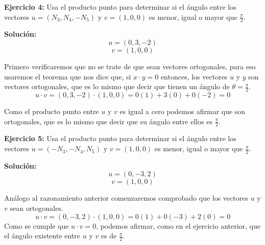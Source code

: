 \documentclass{article}
\begin{document}
\textbf{Ejercicio 4:} Usa el producto punto para determinar si el  ángulo entre los vectores $u = (N_3,N_4,-N_5)$ y $v = (1,0,0)$ es menor,
igual o mayor que $\frac{\pi}{2}$.
\vspace{10pt}


\textbf{Solución:}
$$u = (0, 3, -2)$$
$$v = (1, 0, 0 )$$


Primero verificaremos que no se trate de que sean vectores ortogonales, para eso usaremos el teorema que nos dice que, si $x \cdot y = 0$ entonces,
los vectores $u$ y $y$ son vectores ortogonales, que es lo mismo que decir que tienen un ángulo de $\theta =\frac{\pi}{2}$.
$$u \cdot v = (0, 3, -2) \cdot (1, 0, 0 ) = 0(1)+ 3(0) + 0(-2) = 0$$


Como el producto punto entre $u$ y $v$ es igual a cero podemos afirmar que son ortogonales, que es lo mismo que decir que su ángulo entre ellos es $\frac{\pi}{2}$.
\vspace{10pt}


\textbf{Ejercicio 5:} Usa el producto punto para determinar si el ángulo entre los vectores $u =(-N_3, -N_4, N_5)$ y $v=(1,0,0)$ es menor, igual o mayor que $\frac{\pi}{2}$.
\vspace{10pt}


\textbf{Solución:}
$$u = (0, -3, 2)$$
$$v = (1, 0, 0 )$$


Análogo al razonamiento anterior comenzaremos comprobado que los vectores $u$ y $v$ sean ortogonales.
$$u \cdot v = (0, -3, 2) \cdot (1, 0, 0 ) = 0(1)+ 0(-3) + 2(0) = 0$$
Como se cumple que $u\cdot v = 0$, podemos afirmar, como en el ejercicio anterior, que el ángulo existente entre $u$ y $v$ es de $\frac{\pi}{2}$.
    
\end{document}

